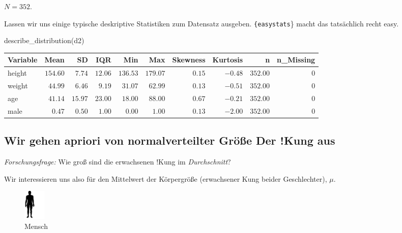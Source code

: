 \documentclass[
  a4paper,
  DIV=11]{scrreprt}
\newenvironment{Shaded}{\begin{snugshade}}{\end{snugshade}}
\newcommand{\FunctionTok}[1]{\textcolor[rgb]{0.28,0.35,0.67}{#1}}
\newcommand{\NormalTok}[1]{\textcolor[rgb]{0.00,0.23,0.31}{#1}}
\theoremstyle{definition}
\theoremstyle{remark}
\begin{document}
\(N=352\).

Lassen wir uns einige typische deskriptive Statistiken zum Datensatz
ausgeben. \texttt{\{easystats}\} macht das tatsächlich recht easy.

\begin{Shaded}
\begin{Highlighting}[]
\FunctionTok{describe\_distribution}\NormalTok{(d2)}
\end{Highlighting}
\end{Shaded}

\begin{longtable}{lrrrrrrrrr}
\toprule
Variable & Mean & SD & IQR & Min & Max & Skewness & Kurtosis & n & n\_Missing \\ 
\midrule
height & $154.60$ & $7.74$ & $12.06$ & $136.53$ & $179.07$ & $0.15$ & $-0.48$ & $352.00$ & $0$ \\ 
weight & $44.99$ & $6.46$ & $9.19$ & $31.07$ & $62.99$ & $0.13$ & $-0.51$ & $352.00$ & $0$ \\ 
age & $41.14$ & $15.97$ & $23.00$ & $18.00$ & $88.00$ & $0.67$ & $-0.21$ & $352.00$ & $0$ \\ 
male & $0.47$ & $0.50$ & $1.00$ & $0.00$ & $1.00$ & $0.13$ & $-2.00$ & $352.00$ & $0$ \\ 
\bottomrule
\end{longtable}

\hypertarget{wir-gehen-apriori-von-normalverteilter-gruxf6uxdfe-der-kung-aus}{%
\subsection{Wir gehen apriori von normalverteilter Größe Der !Kung
aus}\label{wir-gehen-apriori-von-normalverteilter-gruxf6uxdfe-der-kung-aus}}

\emph{Forschungsfrage:} Wie groß sind die erwachsenen !Kung im
\emph{Durchschnitt}?

Wir interessieren uns also für den Mittelwert der Körpergröße
(erwachsener Kung beider Geschlechter), \(\mu\).

\begin{figure}

{\centering \includegraphics[width=0.05\textwidth,height=\textheight]{./img/human.png}

}

\caption{Mensch}

\end{figure}
\end{document}
